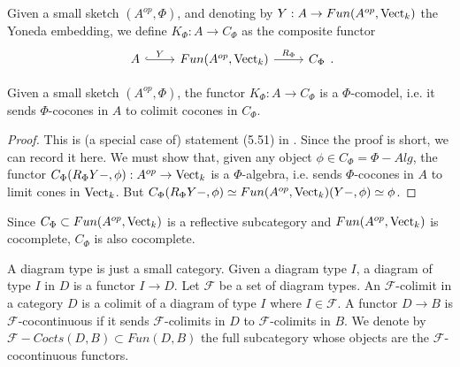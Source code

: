 \begin{definition}

  \noindent Given a small sketch $(A^{op},\Phi)$, and denoting by $Y:A\to
  Fun(A^{op},\operatorname{Vect}_k)$ the Yoneda embedding, we define $K_{\Phi}:A\to
  C_{\Phi}$ as the composite functor
  \[
    \begin{tikzcd} A &
    {Fun(A^{op},\Vect_k)} & {C_{\Phi}} \arrow["Y", hook, from=1-1, to=1-2]
    \arrow["R_{\Phi}", from=1-2, to=1-3]
    \end{tikzcd}.
  \]
\end{definition}

\begin{lemma}

  \noindent Given a small sketch $(A^{op},\Phi)$, the functor $K_{\Phi}:A\to
  C_{\Phi}$ is a $\Phi$-comodel, i.e. it sends $\Phi$-cocones in $A$ to
  colimit cocones in $C_{\Phi}$.
\end{lemma}

\begin{proof}
  This is (a special case of) statement (5.51) in
  \cite{kelly/basic-concepts-enriched}. Since the proof is short, we can
  record it here. We must show that, given any object $\phi\in
  C_{\Phi}=\Phi-Alg$, the functor $C_{\Phi}(R_{\Phi}Y-,\phi):A^{op}\to\operatorname{Vect}_k$
  is a $\Phi$-algebra, i.e. sends $\Phi$-cocones in $A$ to limit cones in
  $\operatorname{Vect}_k$. But $C_{\Phi}(R_{\Phi}Y-,\phi)\simeq
  Fun(A^{op},\operatorname{Vect}_k)(Y-,\phi)\simeq\phi$.
\end{proof}


\begin{remark}

  \noindent Since $C_{\Phi}\subset Fun(A^{op},\operatorname{Vect}_k)$ is a reflective
  subcategory and $Fun(A^{op},\operatorname{Vect}_k)$ is cocomplete, $C_{\Phi}$ is also
  cocomplete.
\end{remark}

\begin{definition}
  \noindent A diagram type is just a small category. Given a diagram type $I$,
  a diagram of type $I$ in $D$ is a functor $I\to D$. Let $\mathcal{F}$ be a
  set of diagram types. An $\mathcal{F}$-colimit in a category $D$ is a
  colimit of a diagram of type $I$ where $I\in \mathcal{F}$. A functor $D\to
  B$ is $\mathcal{F}$-cocontinuous if it sends $\mathcal{F}$-colimits in $D$
  to $\mathcal{F}$-colimits in $B$. We denote by
  $\mathcal{F}-Cocts(D,B)\subset Fun(D,B)$ the full subcategory whose objects
  are the $\mathcal{F}$-cocontinuous functors.
\end{definition}

